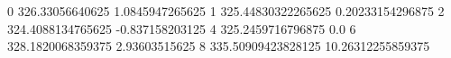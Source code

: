 0 326.33056640625 1.0845947265625
1 325.44830322265625 0.20233154296875
2 324.4088134765625 -0.837158203125
4 325.2459716796875 0.0
6 328.1820068359375 2.93603515625
8 335.50909423828125 10.26312255859375
